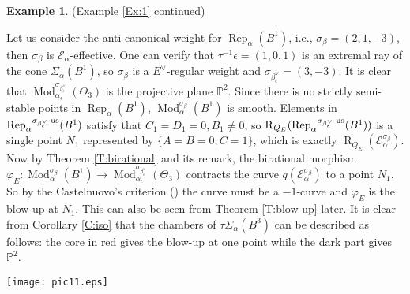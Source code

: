 \documentclass{amsart}
\theoremstyle{definition}
\newtheorem{example}[theorem]{Example}
\theoremstyle{remark}
\numberwithin{equation}{section}
\begin{document}
\begin{example} \label{Ex:1c} (Example \ref{Ex:1} continued)

Let us consider the anti-canonical weight for ${\operatorname{Rep}}_\alpha(B^1)$, i.e., $\sigma_\beta=(2,1,-3)$, then $\sigma_\beta$ is ${\mathcal{{E}}}_\alpha$-effective.
One can verify that $\tau^{-1}\epsilon=(1,0,1)$ is an extremal ray of the cone $\Sigma_\alpha(B^1)$, so $\sigma_\beta$ is a $E^\vee$-regular weight and $\sigma_{\beta_\epsilon^\vee}=(3,-3)$.
It is clear that ${\operatorname{Mod}}_{\alpha_\epsilon}^{\sigma_{\beta_\epsilon^\vee}}(\Theta_3)$ is the projective plane ${\mathbb{{P}}}^2$. Since there is no strictly semi-stable points in ${\operatorname{Rep}}_\alpha(B^1)$, ${\operatorname{Mod}}_\alpha^{\sigma_\beta}(B^1)$ is smooth. Elements in ${\operatorname{Rep}}_\alpha{^{\sigma_{{\beta_\epsilon^\vee}}\cdot{\rm {us}}}}(B^1)$ satisfy that $C_1=D_1=0,B_1\neq 0$, so ${\operatorname{R}}_{Q_E}({\operatorname{Rep}}_\alpha{^{\sigma_{{\beta_\epsilon^\vee}}\cdot{\rm {us}}}}(B^1))$ is a single point $N_1$ represented by $\{A=B=0; C=1\}$, which is exactly ${\operatorname{R}}_{Q_E}({\mathcal{{E}}}_\alpha^{\sigma_\beta})$. Now by Theorem \ref{T:birational} and its remark, the birational morphism $\varphi_E: {\operatorname{Mod}}_\alpha^{\sigma_\beta}(B^1)\to {\operatorname{Mod}}_{\alpha_\epsilon}^{\sigma_{\beta_\epsilon^\vee}}(\Theta_3)$ contracts the curve $q({\mathcal{{E}}}_\alpha^{\sigma_\beta})$ to a point $N_1$. So by the Castelnuovo's criterion (\cite[Theorem 5.7]{Ha}) the curve must be a $-1$-curve and $\varphi_E$ is the blow-up at $N_1$. This can also be seen from Theorem \ref{T:blow-up} later. It is clear from Corollary \ref{C:iso} that the chambers of $\tau\Sigma_\alpha(B^3)$ can be described as follows: the core in red gives the blow-up at one point while the dark part gives ${\mathbb{{P}}}^2$.

\begin{center}
\texttt{[image: pic11.eps]}
\end{center}


\end{example}
\end{document}
